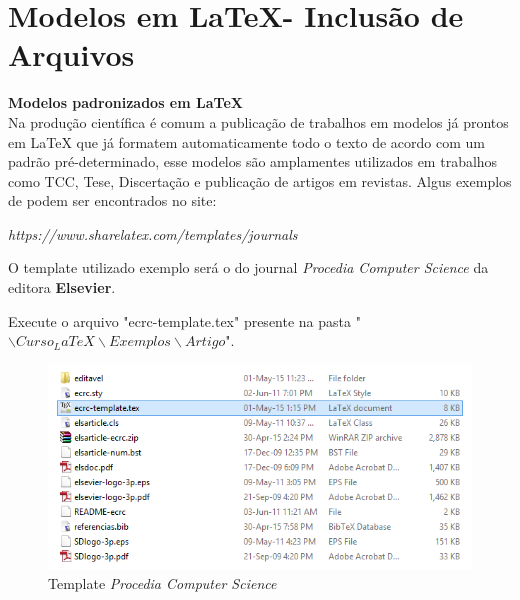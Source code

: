 \section{Modelos em \LaTeX - Inclusão de Arquivos}
\begin{frame}
\textbf{Modelos padronizados em \LaTeX}\\
Na produção científica é comum a publicação de trabalhos em modelos já  prontos em \LaTeX
que já formatem automaticamente todo o texto de acordo com um padrão pré-determinado, esse modelos
são amplamentes utilizados em trabalhos como TCC, Tese, Discertação e publicação de artigos em revistas.
Algus exemplos de podem ser encontrados no site:

\begin{center}
\textit{https://www.sharelatex.com/templates/journals}
\end{center}
\end{frame}


\begin{frame}
O template utilizado exemplo será o do journal \textit{Procedia Computer Science} da editora \textbf{Elsevier}.

Execute o arquivo "ecrc-template.tex" presente na pasta "$\backslash Curso_LaTeX \backslash Exemplos \backslash Artigo$".
\begin{figure}
\begin{center}
\includegraphics[scale=0.5]{figuras/figelsiever}
\caption{Template \textit{Procedia Computer Science}}
\end{center}
\end{figure}
\end{frame}

